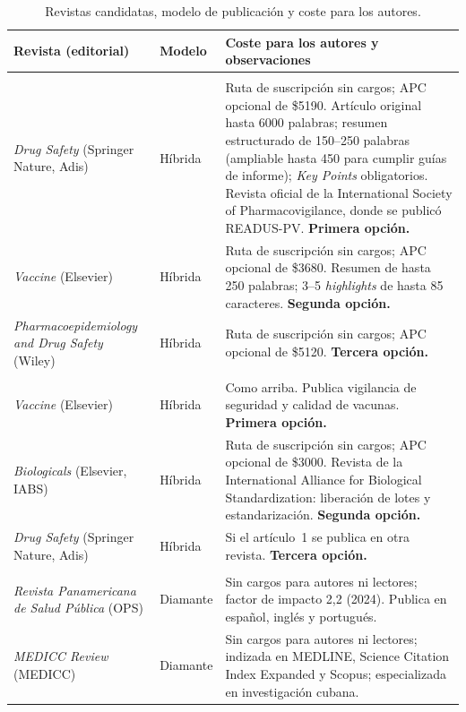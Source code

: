 \documentclass[11pt]{article}
\begin{document}
\begin{table}[htbp]
\centering\small
\caption{Revistas candidatas, modelo de publicación y coste para los autores.}
\label{tab:journals}
\begin{tabularx}{\textwidth}{@{}>{\raggedright\arraybackslash}p{3.4cm}>{\raggedright\arraybackslash}p{1.8cm}Y@{}}
\toprule
Revista (editorial) & Modelo & Coste para los autores y observaciones \\
\midrule
{}\\
\emph{Drug Safety} (Springer Nature, Adis) & Híbrida & Ruta de suscripción sin cargos; APC
opcional de \$5190. Artículo original hasta 6000 palabras; resumen estructurado de 150--250 palabras
(ampliable hasta 450 para cumplir guías de informe); \emph{Key Points} obligatorios. Revista oficial
de la International Society of Pharmacovigilance, donde se publicó READUS-PV. \textbf{Primera opción.} \\
\emph{Vaccine} (Elsevier) & Híbrida & Ruta de suscripción sin cargos; APC opcional de \$3680. Resumen
de hasta 250 palabras; 3--5 \emph{highlights} de hasta 85 caracteres. \textbf{Segunda opción.} \\
\emph{Pharmaco\-epidemiology and Drug Safety} (Wiley) & Híbrida & Ruta de suscripción sin cargos; APC
opcional de \$5120. \textbf{Tercera opción.} \\
\addlinespace
{}\\
\emph{Vaccine} (Elsevier) & Híbrida & Como arriba. Publica vigilancia de seguridad y calidad de
vacunas. \textbf{Primera opción.} \\
\emph{Biologicals} (Elsevier, IABS) & Híbrida & Ruta de suscripción sin cargos; APC opcional de
\$3000. Revista de la International Alliance for Biological Standardization: liberación de lotes y
estandarización. \textbf{Segunda opción.} \\
\emph{Drug Safety} (Springer Nature, Adis) & Híbrida & Si el artículo~1 se publica en otra revista.
\textbf{Tercera opción.} \\
\addlinespace
{}\\
\emph{Revista Panamericana de Salud Pública} (OPS) & Diamante & Sin cargos para autores ni
lectores; factor de impacto 2,2 (2024). Publica en español, inglés y portugués. \\
\emph{MEDICC Review} (MEDICC) & Diamante & Sin cargos para autores ni lectores; indizada en MEDLINE,
Science Citation Index Expanded y Scopus; especializada en investigación cubana. \\
\bottomrule
\end{tabularx}
\end{table}
\end{document}
